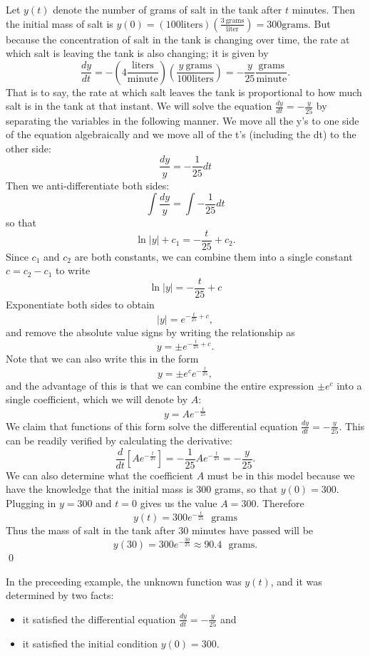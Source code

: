 \documentclass[12pt,letterpaper,twoside]{amsart}
\newcounter{example}
\newcommand{\solution}{\medskip \noindent {\bf Solution: }}
\begin{document}
\solution Let $y(t)$ denote the number of grams of salt in the tank after $t$ minutes. Then the initial mass of salt is $y(0)=(100 \mbox{liters})\left(\frac{3 \ \mbox{grams}}{\mbox{liter}}\right) = 300 \mbox{grams}$.  But because the concentration of salt in the tank is changing over time, the rate at which salt is leaving the tank is also changing; it is given by
\[ \frac{dy}{dt}=-\left( 4 \frac{\mbox{liters}}{\mbox{minute}} \right) \left( \frac{y \ \mbox{grams}}{100 \mbox{liters}} \right) = -\frac{y}{25}   \frac{\mbox{grams}}{\mbox{minute}}.\]
That is to say, the rate at which salt leaves the tank is proportional to how much salt is in the tank at that instant.  We will solve the equation $\frac{dy}{dt}= -\frac{y}{25}$ by separating the variables in the following manner.  We move all the y's to one side of the equation algebraically and we move all of the t's (including the dt) to the other side:
\[ \frac{dy}{y}=-\frac{1}{25}dt\]
Then we anti-differentiate both sides:
\[ \int \frac{dy}{y}=\int -\frac{1}{25} dt \]
so that
\[ \ln |y| + c_1 = -\frac{t}{25} + c_2.\]
Since $c_1$ and $c_2$ are both constants, we can combine them into a single constant $c=c_2-c_1$ to write
\[ \ln |y| = -\frac{t}{25}+c\]
Exponentiate both sides to obtain
\[ |y| = e^{-\frac{t}{25}+c},\]
and remove the absolute value signs by writing the relationship as
\[ y = \pm e^{-\frac{t}{25}+c}.\]
Note that we can also write this in the form
\[ y = \pm e^c e^{-\frac{t}{25}},\]
and the advantage of this is that we can combine the entire expression $\pm e^c$ into a single coefficient, which we will denote by $A$:
\[ y=Ae^{-\frac{t}{25}}\]
We claim that functions of this form solve the differential equation $\frac{dy}{dt}=-\frac{y}{25}$.  This can be readily verified by calculating the derivative:
\[ \frac{d}{dt} \left[ Ae^{-\frac{t}{25}} \right] = -\frac{1}{25}Ae^{-\frac{t}{25}} = -\frac{y}{25}.\]
We can also determine what the coefficient $A$ must be in this model because we have the knowledge that the initial mass is 300 grams, so that $y(0)=300$.  Plugging in $y=300$ and $t=0$ gives us the value $A=300$.  Therefore 
\[ y(t) = 300e^{-\frac{t}{25}} \ \ \ \mbox{grams}\]
Thus the mass of salt in the tank after 30 minutes have passed will be
\[ y(30)=300e^{-\frac{30}{25}} \approx 90.4 \ \ \ \mbox{grams}.\]
\qed

In the preceeding example, the unknown function was $y(t)$, and it was determined by two facts:
\begin{itemize}
\item it satisfied the differential equation $\frac{dy}{dt}=-\frac{y}{25}$ and
\item it satisfied the initial condition $y(0)=300$.
\end{itemize}
\end{document}
